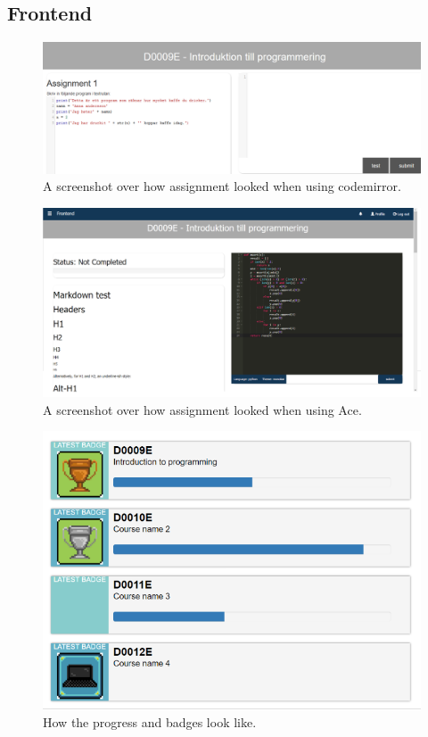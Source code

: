 \documentclass[a4paper,12pt]{article}
\begin{document}
\subsection{Frontend}
\begin{figure}[H]
\centering
\includegraphics[scale=0.45]{Codemirror_pic.png}
\caption{A screenshot over how assignment looked when using codemirror.}
\end{figure}
\begin{figure}[H]
\centering
\includegraphics[scale=0.5]{Ace.png}
\caption{A screenshot over how assignment looked when using Ace. }
\end{figure}
\begin{figure}[H]
\centering
\includegraphics[scale=0.6]{Progress.png}
\caption{How the progress and badges look like.}
\end{figure}
\end{document}
